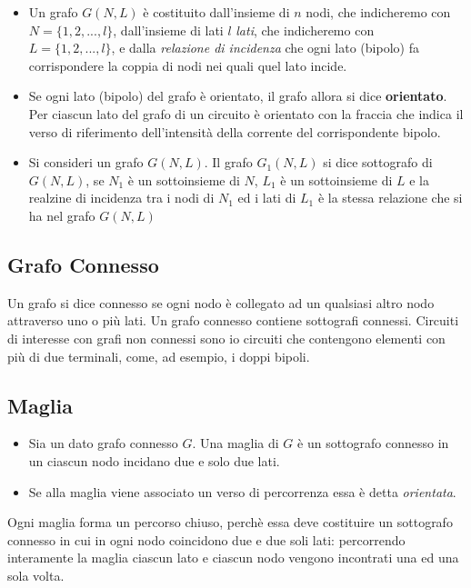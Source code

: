 \documentclass[a4paper]{report}
\begin{document}
\begin{itemize}
  \item Un grafo $G(N, L)$ \`e costituito dall'insieme di $n$ nodi, che
    indicheremo con $N=\{1, 2,..., l\}$, dall'insieme di lati $l$
    \emph{lati}, che indicheremo con \\$L=\{1, 2,..., l\}$, e dalla
    \emph{relazione di incidenza} che ogni lato (bipolo) fa
    corrispondere la coppia di nodi nei quali quel lato incide.
  \item Se ogni lato (bipolo) del grafo \`e orientato, il grafo allora
    si dice {\bf orientato}. Per ciascun lato del grafo di un circuito
    \`e orientato con la fraccia che indica il verso di riferimento
    dell'intensit\`a della corrente del corrispondente bipolo.
  \item Si consideri un grafo $G(N, L)$. Il grafo $G_1(N, L)$ si dice
    sottografo di $G(N, L)$, se $N_1$ \`e un sottoinsieme di $N$,
    $L_1$ \`e un sottoinsieme di $L$ e la realzine di incidenza tra i
    nodi di $N_1$ ed i lati di $L_1$ \`e la stessa relazione che si ha
    nel grafo $G(N, L)$
\end{itemize}

\subsection{Grafo Connesso}

Un grafo si dice connesso se ogni nodo \`e collegato ad un qualsiasi
altro nodo attraverso uno o pi\`u lati.
Un grafo connesso contiene sottografi connessi. Circuiti di interesse
con grafi non connessi sono io circuiti che contengono elementi con
pi\`u di due terminali, come, ad esempio, i doppi bipoli.

\subsection{Maglia}
\begin{itemize}
\item Sia un dato grafo connesso $G$. Una maglia di $G$ \`e un sottografo
  connesso in un ciascun nodo incidano due e solo due lati.
\item Se alla maglia viene associato un verso di percorrenza essa \`e
  detta \emph{orientata}.
\end{itemize}

Ogni maglia forma un percorso chiuso, perch\`e essa deve costituire un
sottografo connesso in cui in ogni nodo coincidono due e due soli
lati: percorrendo interamente la maglia ciascun lato e ciascun nodo
vengono incontrati una ed una sola volta.
\end{document}
